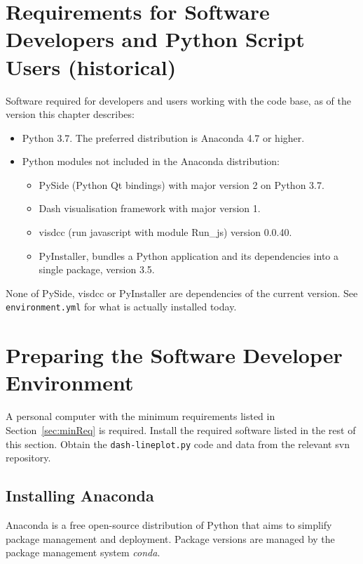 \section{Requirements for Software Developers and Python Script Users (historical)}
\label{sec:requirements}

Software required for developers and users working with the code base, as of the version this chapter describes:

\begin{itemize}
  \item Python 3.7. The preferred distribution is Anaconda 4.7 or higher.
  \item Python modules not included in the Anaconda distribution:
  \begin{itemize}
  \item PySide (Python Qt bindings) with major version 2 on Python 3.7.
  \item Dash visualisation framework with major version 1.
  \item visdcc (run javascript with module Run\_js) version 0.0.40.
  \item PyInstaller, bundles a Python application and its dependencies into a single package, version 3.5.
  \end{itemize}
\end{itemize}

None of PySide, visdcc or PyInstaller are dependencies of the current
version. See \texttt{environment.yml} for what is actually installed today.


\section{Preparing the Software Developer Environment}
\label{sec:softwaredev}

A personal computer with the minimum requirements listed in Section~\ref{sec:minReq} is required. Install the required software listed in the rest of this section.
Obtain the \texttt{dash-lineplot.py} code and data from the relevant \ac{svn} repository.

\subsection{Installing Anaconda}

Anaconda is a free open-source distribution of Python that aims to simplify package management and deployment. Package versions are managed by the package management system \textsl{conda}.

